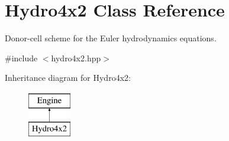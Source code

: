 \hypertarget{classHydro4x2}{}\section{Hydro4x2 Class Reference}
\label{classHydro4x2}


Donor-\/cell scheme for the Euler hydrodynamics equations.  




{\ttfamily \#include $<$hydro4x2.\+hpp$>$}

Inheritance diagram for Hydro4x2\+:\begin{figure}[H]
\begin{center}
\leavevmode
\includegraphics[height=2.000000cm]{classHydro4x2}
\end{center}
\end{figure}
